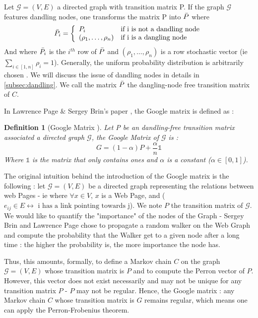 \documentclass{article}
\newtheorem{definition}{Definition}[section]
\begin{document}
Let $\mathcal{G}=(V,E)$ a directed graph with transition matrix P. 
If the graph $\mathcal{G}$ features dandling nodes, one transforms the matrix P into $\Bar{P}$ where 
\begin{equation*}\label{eq:dangling_nodes_free}
    \Bar{P_{i}} = \left\{
    \begin{array}{ll}
        P_{i} & \mbox{if i is not a dandling node}  \\
        (\rho_1, \hdots, \rho_n) & \mbox{if i is a dangling node}
    \end{array}
    \right.
\end{equation*} 
And where $\Bar{P_{i}}$ is the $i^{th}$ row of $\Bar{P}$ and  $(\rho_1, \hdots, \rho_n)$ is a row stochastic vector (ie $\underset{i \in [1, n]}{\sum} \rho_i = 1$). Generally, the uniform probability distribution is arbitrarily chosen \cite{langville_meyer_2004}. We will discuss the issue of dandling nodes in details in \ref{subsec:dandling}. We call the matrix $\Bar{P}$ the dangling-node free transition matrix of $C$.

In Lawrence Page $\&$ Sergey Brin's paper \cite{brin_page_1998}, the Google matrix is defined as : 

\begin{definition}[Google Matrix \cite{brin_page_1998}]
\label{def:google_matrix}
Let P be an dandling-free transition matrix associated a directed graph $\mathcal{G}$, the Google Matrix of $\mathcal{G}$ is :
\begin{equation*}
    G = (1-\alpha) P + \frac{\alpha}{n} \mathbb{1}
\end{equation*}
Where $\mathbb{1}$ is the matrix that only contains ones and $\alpha$ is a constant ($\alpha \in [0,1]$).

\end{definition}

The original intuition behind the introduction of the Google matrix is the following : let $\mathcal{G}=(V,E)$ be a directed graph representing the relations between web Pages - ie where $\forall x \in V$, $x$ is a Web Page, and ($e_{ij} \in E \leftrightarrow \mbox{ i has a link pointing towards j}$). We note $P$ the transition matrix of $\mathcal{G}$. We would like to quantify the "importance" of the nodes of the Graph - Sergey Brin and Lawrence Page chose to propagate a random walker on the Web Graph and compute the probability that the Walker get to a given node after a long time : the higher the probability is, the more importance the node has.

Thus, this amounts, formally, to define a Markov chain $C$ on the graph $\mathcal{G}=(V, E)$ whose transition matrix is $P$ and to compute the Perron vector of $P$. However, this vector does not exist necessarily and may not be unique for any transition matrix $P$ - $P$ may not be regular. Hence, the Google matrix : any Markov chain $C$ whose transition matrix is $G$ remains regular, which means one can apply the Perron-Frobenius theorem.
\end{document}
